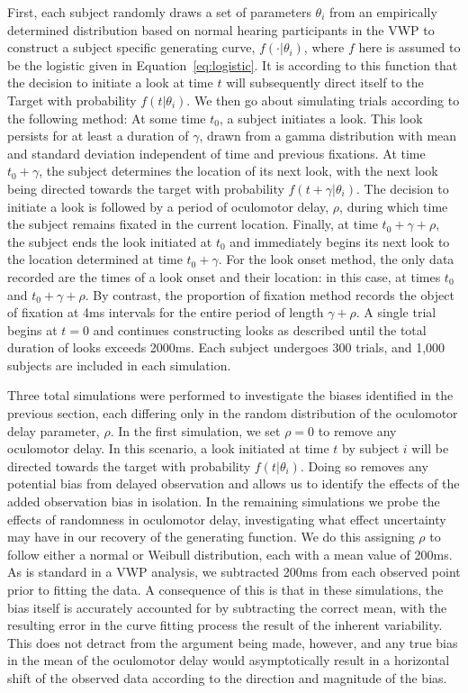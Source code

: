 First, each subject randomly draws a set of parameters $\theta_i$ from an empirically determined distribution based on normal hearing participants in the VWP \cite{FarrisTrimble2014} to construct a subject specific generating curve, $f(\cdot | \theta_i)$, where $f$ here is assumed to be the logistic given in Equation~\ref{eq:logistic}.   It is according to this function that the decision to initiate a look at time $t$ will subsequently direct itself to the Target with probability $f(t|\theta_i)$. We then go about simulating trials according to the following method: At some time $t_0$, a subject initiates a look. This look persists for at least a duration of $\gamma$, drawn from a gamma distribution with mean and standard deviation independent of time and previous fixations. At time $t_0+\gamma$, the subject determines the location of its next look, with the next look being directed towards the target with probability $f(t+\gamma | \theta_i)$. The decision to initiate a look is followed by a period of oculomotor delay, $\rho$, during which time the subject remains fixated in the current location. Finally, at time $t_0 + \gamma + \rho$, the subject ends the look initiated at $t_0$ and immediately begins its next look to the location determined at time $t_0 + \gamma$. For the look onset method, the only data recorded are the times of a look onset and their location: in this case, at times $t_0$ and $t_0 + \gamma + \rho$. By contrast, the proportion of fixation method records the object of fixation at 4ms intervals for the entire period of length $\gamma + \rho$. A single trial begins at $t = 0$ and continues constructing looks as described until the total duration of looks exceeds 2000ms. Each subject undergoes 300 trials, and 1,000 subjects are included in each simulation.

Three total simulations were performed to investigate the biases identified in the previous section, each differing only in the random distribution of the oculomotor delay parameter, $\rho$. In the first simulation, we set $\rho = 0$ to remove any oculomotor delay. In this scenario, a look initiated at time $t$ by subject $i$ will be directed towards the target with probability $f(t|\theta_i)$. Doing so removes any potential bias from delayed observation and allows us to identify the effects of the added observation bias in isolation. In the remaining simulations we probe the effects of randomness in oculomotor delay, investigating what effect uncertainty may have in our recovery of the generating function. We do this assigning $\rho$ to follow either a normal or Weibull distribution, each with a mean value of 200ms. As is standard in a VWP analysis, we subtracted 200ms from each observed point prior to fitting the data. A consequence of this is that in these simulations, the bias itself is accurately accounted for by subtracting the correct mean, with the resulting error in the curve fitting process the result of the inherent variability. This does not detract from the argument being made, however, and any true bias in the mean of the oculomotor delay would asymptotically result in a horizontal shift of the observed data according to the direction and magnitude of the bias.


